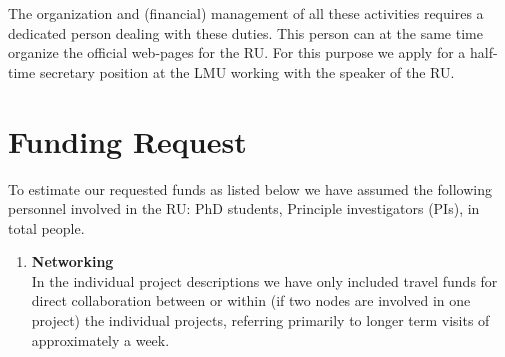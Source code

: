 \documentclass[10pt,fleqn,twoside]{article}
\begin{document}
The organization and (financial) management of all these activities requires
a dedicated person dealing with these duties. This person can at the same
time organize the official web-pages for the RU.  For this purpose we apply
for a half-time secretary position at the LMU working with the speaker of
the RU.
%
\section{Funding Request}
%
To estimate our requested funds as listed below we have assumed the
following personnel involved in the RU:  PhD students,
 Principle investigators (PIs), in total  people.
%
\begin{enumerate}
\item {\bf Networking} \\
In the individual project descriptions we have only included travel funds for
direct collaboration between or within (if two nodes are involved in one
project) the individual projects, referring primarily to longer term visits
of approximately a week.


\end{enumerate}
\end{document}

